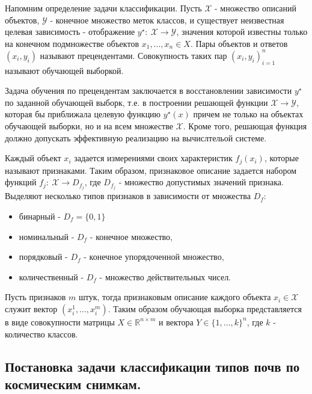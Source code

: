 \documentclass[14pt]{extarticle}
\begin{document}
\par
Напомним определение задачи классификации. 
Пусть $\mathcal{X}$ - множество описаний объектов, 
$\mathcal{Y}$ - конечное множество меток классов, и 
существует неизвестная целевая зависимость - отображение 
$y^\star:\ \mathcal{X} \to \mathcal{Y}$, 
значения которой известны только на конечном подмножестве объектов
$x_1, ..., x_n \in X$. Пары объектов и ответов $(x_i, y_i)$ называют прецендентами.
Совокупность таких пар ${(x_i, y_i)}_{i=1}^n$ называют обучающей выборкой.
\par
Задача обучения по прецендентам заключается в восстановлении зависимости $y^\star$
по заданной обучающей выборк, т.е. в построении решающей функции 
$\mathcal{X} \to \mathcal{Y}$, которая бы
приближала целевую функцию $y^\star(x)$ причем не только на объектах обучающей выборки,
но и на всем множестве $\mathcal{X}$. Кроме того, решающая функция должно допускать эффективную
реализацию на вычислтельой системе.
\par
Каждый объект $x_i$ задается измерениями своих характеристик $f_j(x_i)$, 
которые называют признаками. Таким образом, признаковое описание задается набором функций
$f_j:\ \mathcal{X}\to D_{f_j}$, где $D_{f_j}$ - множество допустимых значений признака.
Выделяют несколько типов признаков в зависимости от множества $D_f$:
\begin{itemize} 
    \item бинарный - $D_f=\{0,1\}$
    \item номинальный - $D_f$ - конечное множество,
    \item порядковый - $D_f$ - конечное упорядоченной множество,
    \item количественный - $D_f$ - множество действительных чисел.
\end{itemize}
Пусть признаков $m$ штук, тогда признаковым описание каждого объекта 
$x_i \in \mathcal{X}$ служит вектор $(x_i^1, ..., x_i^m)$. 
Таким образом обучающая выборка представляется в виде совокупности матрицы 
$X \in \mathbb{R}^{n \times m}$ и вектора $Y \in \{1, ..., k\}^n$, где 
$k$ - количество классов.

\subsection{Постановка задачи классификации типов почв по космическим снимкам.}
\end{document}
